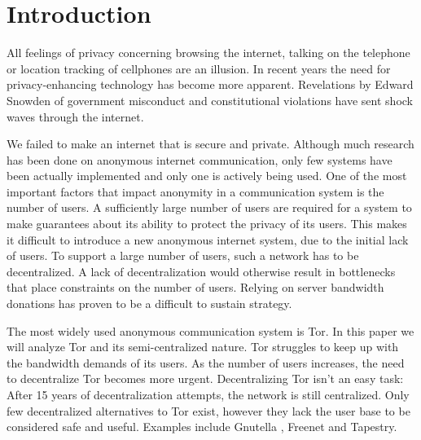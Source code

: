 \documentclass{article}
\begin{document}
\begin{abstract}
\end{abstract}


\section{Introduction}
	All feelings of privacy concerning browsing the internet, talking on the telephone or location tracking of cellphones are an illusion. In recent years the need for privacy-enhancing technology has become more apparent. Revelations by Edward Snowden of government misconduct and constitutional violations have sent shock waves through the internet.
	
	We failed to make an internet that is secure and private. Although much research has been done on anonymous internet communication, only few systems have been actually implemented and only one is actively being used. One of the most important factors that impact anonymity in a communication system is the number of users. A sufficiently large number of users are required for a system to make guarantees about its ability to protect the privacy of its users. This makes it difficult to introduce a new anonymous internet system, due to the initial lack of users. To support a large number of users, such a network has to be decentralized. A lack of decentralization would otherwise result in bottlenecks that place constraints on the number of users. Relying on server bandwidth donations has proven to be a difficult to sustain strategy.
	
	The most widely used anonymous communication system is Tor. In this paper we will analyze Tor and its semi-centralized nature. Tor struggles to keep up with the bandwidth demands of its users. As the number of users increases, the need to decentralize Tor becomes more urgent. Decentralizing Tor isn't an easy task: After 15 years of decentralization attempts, the network is still centralized. Only few decentralized alternatives to Tor exist, however they lack the user base to be considered safe and useful. Examples include Gnutella \cite{ripeanu2001peer}, Freenet \cite{lua2005survey} and Tapestry.
	
\end{document}
